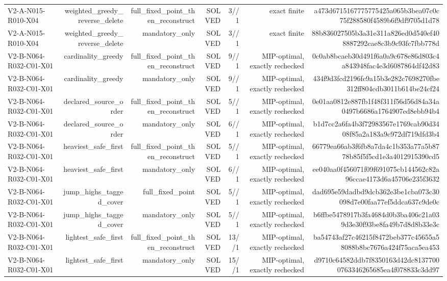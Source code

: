 {\begin{longtable}{lrrrrrr}
V2-A-N015-R010-X04 & weighted\_greedy\_reverse\_delete & full\_fixed\_point\_then\_reconstruct & SOLVED & 3//1 & exact finite & a473d6715167775775425a065b3bea07c0c75f288580f4589b6f9df9705d1d78 \\
V2-A-N015-R010-X04 & weighted\_greedy\_reverse\_delete & mandatory\_only & SOLVED & 3//1 & exact finite & 88b836027505b3a31e311a826ed0d540ef408887292cae8c3b9c93fc7fbb778d \\
V2-B-N064-R032-C01-X01 & cardinality\_greedy & full\_fixed\_point\_then\_reconstruct & SOLVED & 9//1 & MIP-optimal, exactly rechecked & 0c0ab8bcaeb30d491f6a0a9c678e86d803c4a843948fac4e3d6087864df42d83 \\
V2-B-N064-R032-C01-X01 & cardinality\_greedy & mandatory\_only & SOLVED & 9//1 & MIP-optimal, exactly rechecked & 434f9d3fcd2196fc9a15b3e282c7698270fbe312ff804cdb3011b614be24cf24 \\
V2-B-N064-R032-C01-X01 & declared\_source\_order & full\_fixed\_point\_then\_reconstruct & SOLVED & 5//1 & MIP-optimal, exactly rechecked & 0e01aa0812e887fb1f48f311f56d56d84a34a0497b6686a1764907ed8ebb94b4 \\
V2-B-N064-R032-C01-X01 & declared\_source\_order & mandatory\_only & SOLVED & 6//1 & MIP-optimal, exactly rechecked & b1d7cc2a6fa4b3f72983567e1769cab90d3408f85a2a183a9c972df719dfd3b4 \\
V2-B-N064-R032-C01-X01 & heaviest\_safe\_first & full\_fixed\_point\_then\_reconstruct & SOLVED & 5//1 & MIP-optimal, exactly rechecked & 66779ea66ab3f6fb8a7da4c1b353a77a5b8778b85f5f5cd1e3a4012915390cd5 \\
V2-B-N064-R032-C01-X01 & heaviest\_safe\_first & mandatory\_only & SOLVED & 6//1 & MIP-optimal, exactly rechecked & ee040aa0f456071f09f691075cb144562c82a96ccae4173d6a45706e235f3632 \\
V2-B-N064-R032-C01-X01 & jump\_highs\_tagged\_cover & full\_fixed\_point & SOLVED & 5//1 & MIP-optimal, exactly rechecked & dad695e59dadbd9dcb362e3be1cba073c30098d7e00faa77ef5ddca637c9de0c \\
V2-B-N064-R032-C01-X01 & jump\_highs\_tagged\_cover & mandatory\_only & SOLVED & 5//1 & MIP-optimal, exactly rechecked & b6ffbe5478917b3fa4684d0b3ba406c21a039d3e30f93be8fa49b7d8d8b33e3c \\
V2-B-N064-R032-C01-X01 & lightest\_safe\_first & full\_fixed\_point\_then\_reconstruct & SOLVED & 13//1 & MIP-optimal, exactly rechecked & ba54743af27c46215f8472beb377c45655a58088b8bc7676a424f75aca5ea453 \\
V2-B-N064-R032-C01-X01 & lightest\_safe\_first & mandatory\_only & SOLVED & 15//1 & MIP-optimal, exactly rechecked & d9710c64582ddb7f8350163d42dc81377000763346265685ea4f078833c3dd97 \\

\end{longtable}}
